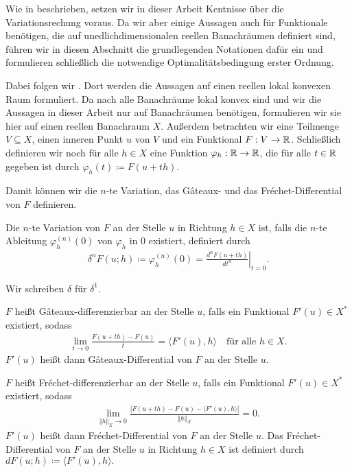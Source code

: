Wie in  beschrieben, setzen wir in dieser Arbeit
Kentnisse über die Variationsrechung voraus. 
Da wir aber einige Aussagen auch für Funktionale benötigen, die auf
unedlichdimensionalen reellen Banachräumen definiert sind, führen
wir in diesen Abschnitt die grundlegenden Notationen dafür ein und formulieren
schließlich die notwendige Optimalitätsbedingung erster Ordnung.

Dabei folgen wir \cite[S. 189-194]{Zei85}. 
Dort werden die Aussagen auf einen reellen lokal konvexen
Raum formuliert. Da nach \cite[S. 781, (43)]{Zei86} alle Banachräume 
lokal konvex sind und wir die Aussagen in dieser Arbeit
nur auf Banachräumen benötigen, formulieren wir sie hier auf einen reellen 
Banachraum $X$. 
Außerdem betrachten wir eine Teilmenge $V\subseteq X$, einen
inneren Punkt $u$ von $V$ und ein Funktional $F:V\to\mathbb{R}$. 
Schließlich definieren wir noch für alle $h\in X$ eine Funktion
$\varphi_h:\mathbb{R}\to\mathbb{R}$, die für alle $t\in\mathbb{R}$ gegeben ist durch
$\varphi_h(t)\coloneqq F(u+th)$.

Damit können wir die $n$-te Variation, das G\^ateaux- und das 
Fr\'echet-Differential von $F$ definieren.

\begin{definition}[$n$-te Variation]
  Die $n$-te Variation von $F$ an der Stelle $u$ in Richtung $h\in X$ ist,
  falls die $n$-te Ableitung $\varphi_h^{(n)}(0)$ von $\varphi_h$ in $0$
  existiert, definiert durch 
  \begin{align*}
    \delta^n F(u;h)\coloneqq \varphi_h^{(n)}(0)=
    \left. \frac{d^n F(u+th)}{dt^n}\right|_{t=0}.
  \end{align*}

  Wir schreiben $\delta$ für $\delta^1$.
\end{definition}

\begin{definition}
  $F$ heißt G\^ateaux-differenzierbar an der Stelle $u$, falls ein 
  Funktional $F'(u)\in X^\ast$ existiert, sodass
  \begin{align*}
    \lim_{t\to 0}\frac{F(u+th)-F(u)}{t} = \langle F'(u), h\rangle\quad
    \text{für alle } h\in X.
  \end{align*}
  $F'(u)$ heißt dann G\^ateaux-Differential von $F$ an der Stelle $u$.

  $F$ heißt Fr\'echet-differenzierbar an der Stelle $u$, falls ein Funktional
  $F'(u)\in X^\ast$ existiert, sodass
  \begin{align*}
    \lim_{\Vert h\Vert_X\to 0}\frac{|F(u+th)-F(u)-
    \langle F'(u),h\rangle|}{\Vert h\Vert_X} =0.
  \end{align*}
  $F'(u)$ heißt dann Fr\'echet-Differential von $F$ an der Stelle $u$.
  Das Fr\'echet-Differential von $F$ an der Stelle $u$ in Richtung $h\in X$
  ist definiert durch $dF(u;h)\coloneqq \langle F'(u),h\rangle.$
\end{definition}

